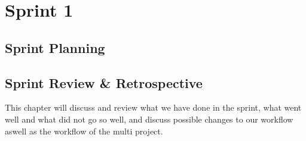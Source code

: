 \part{Sprint 1}
\chapter{Sprint Planning}


\chapter{Sprint Review \& Retrospective}
This chapter will discuss and review what we have done in the sprint, what went well and what did not go so well, and discuss possible changes to our workflow aswell as the workflow of the multi project.




